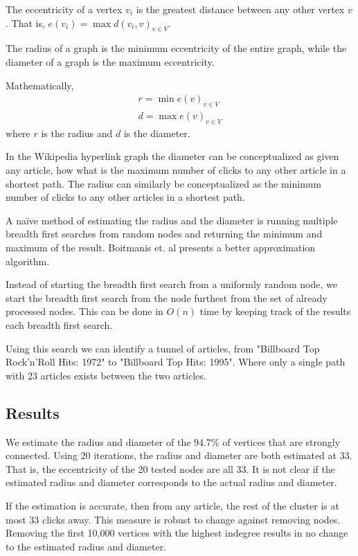 \documentclass{article}
\begin{document}
The eccentricity of a vertex $v_i$ is the greatest distance between any other vertex $v$. That is, $e(v_i) = \max d(v_i, v)_{v \in V}$.

The radius of a graph is the minimum eccentricity of the entire graph, while the diameter of a graph is the maximum eccentricity.


Mathematically,
\begin{align*}
    r = \min e(v)_{v \in V} \\
    d = \max e(v)_{v \in V}
\end{align*}
where $r$ is the radius and $d$ is the diameter.

In the Wikipedia hyperlink graph the diameter can be conceptualized as given any article, how what is the maximum number of clicks to any other article in a shortest path. The radius can similarly be conceptualized as the minimum number of clicks to any other articles in a shortest path.


A naïve method of estimating the radius and the diameter is running multiple breadth first searches from random nodes and returning the minimum and maximum of the result. Boitmanis et. al presents a better approximation algorithm.

Instead of starting the breadth first search from a uniformly random node, we start the breadth first search from the node furthest from the set of already processed nodes. This can be done in $O(n)$ time by keeping track of the results each breadth first search.

Using this search we can identify a tunnel of articles, from "Billboard Top Rock'n'Roll Hits: 1972" to "Billboard Top Hits: 1995". Where only a single path with 23 articles exists between the two articles.


\subsection*{Results}

We estimate the radius and diameter of the 94.7\% of vertices that are strongly connected.
Using 20 iterations, the radius and diameter are both estimated at 33. That is, the eccentricity of the 20 tested nodes are all 33.
It is not clear if the estimated radius and diameter corresponds to the actual radius and diameter.

If the estimation is accurate, then from any article, the rest of the cluster is at most 33 clicks away.
This measure is robust to change against removing nodes. Removing the first 10,000 vertices with the highest indegree results in no change to the estimated radius and diameter. 
\end{document}
